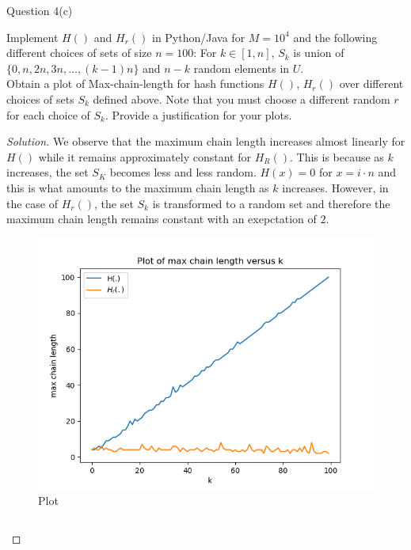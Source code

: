 \begin{solution}{Question 4(c)}\label{ques:4c}
    \begin{question}
      Implement $H()$ and $H_r()$ in Python/Java for $M = 10^4$ and the following different choices of sets of size $n = 100$: For $k \in [1, n]$, $S_k$ is union of $\{0, n, 2n, 3n, \ldots, (k-1)n\}$ and $n-k$ random elements in $U$.\\
Obtain a plot of Max-chain-length for hash functions $H()$, $H_r()$ over different choices of sets $S_k$ defined above. Note that you must choose a different random $r$ for each choice of $S_k$. Provide a justification for your plots.
    \end{question}
    \tcblower{}
    \begin{proof}[Solution]
      We observe that the maximum chain length increases almost linearly for $H()$ while it remains approximately constant for $H_R()$. This is because as $k$ increases, the set $S_K$ becomes less and less random. $H(x) = 0$ for $x = i\cdot n$ and this is what amounts to the maximum chain length as $k$ increases. However, in the case of $H_r()$, the set $S_k$ is transformed to a random set and therefore the maximum chain length remains constant with an exepctation of $2$.
      \begin{figure}[H]
        \centering
        \includegraphics[width=0.5\linewidth]{4c.png}
        \caption{Plot}
      \end{figure}
      \inputminted{python}{4c.py}
    \end{proof}
\end{solution}
